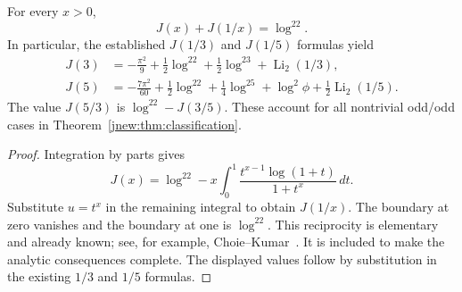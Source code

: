 \begin{proposition}
\label{jnew:prop:reciprocity}
For every $x>0$,
\begin{equation}\label{jnew:eq:analytic-reciprocity}
 J(x)+J(1/x)=\log^22.
\end{equation}
In particular, the established $J(1/3)$ and $J(1/5)$ formulas yield
\begin{align*}
 J(3)&=-\frac{\pi^2}{9}+\frac12\log^22+\frac12\log^23
                                     +\operatorname{Li}_2(1/3),\\
 J(5)&=-\frac{7\pi^2}{60}+\frac12\log^22+\frac14\log^25
                    +\log^2\phi+\frac12\operatorname{Li}_2(1/5).
\end{align*}
The value $J(5/3)$ is $\log^22-J(3/5)$. These account for all
nontrivial odd/odd cases in Theorem~\ref{jnew:thm:classification}.
\end{proposition}
\begin{proof}
Integration by parts gives
\[
 J(x)=\log^22-
 x\int_0^1\frac{t^{x-1}\log(1+t)}{1+t^x}\,dt.
\]
Substitute $u=t^x$ in the remaining integral to obtain $J(1/x)$.
The boundary at zero vanishes and the boundary at one is $\log^22$.
This reciprocity is elementary and already known; see, for example,
Choie--Kumar~\cite[Theorem~3.1]{ChoieKumar2023}. It is included to
make the analytic consequences complete. The displayed values follow
by substitution in the existing $1/3$ and $1/5$ formulas.
\end{proof}
